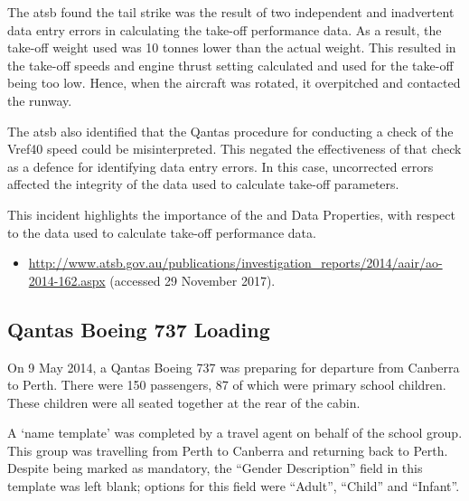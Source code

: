 The \gls{atsb} found the tail strike was the result of two independent and inadvertent data entry errors in calculating the take-off performance data. As a result, the take-off weight used was 10 tonnes lower than the actual weight. This resulted in the take-off speeds and engine thrust setting calculated and used for the take-off being too low. Hence, when the aircraft was rotated, it overpitched and contacted the runway.

The \gls{atsb} also identified that the Qantas procedure for conducting a check of the Vref40 speed could be misinterpreted. This negated the effectiveness of that check as a defence for identifying data entry errors. In this case, uncorrected errors affected the \gls{integrity} of the data used to calculate take-off parameters.

This incident highlights the importance of the  and  Data Properties, with respect to the data used to calculate take-off performance data.

\begin{samepage}
\begin{itemize}
  \item \raggedright{\href{http://www.atsb.gov.au/publications/investigation_reports/2014/aair/ao-2014-162.aspx}{http://www.atsb.gov.au/publications/investigation\_reports/2014/aair/ao-2014-162.aspx} (accessed 29 November 2017).}
\end{itemize}
\end{samepage}


\subsection{Qantas Boeing 737 Loading} \label{bkm:incacc:qantasloading}
On 9 May 2014, a Qantas Boeing 737 was preparing for departure from Canberra to Perth. There were 150 passengers, 87 of which were primary school children. These children were all seated together at the rear of the cabin. 

A `name template' was completed by a travel agent on behalf of the school group. This group was travelling from Perth to Canberra and returning back to Perth. Despite being marked as mandatory, the ``Gender Description'' field in this template was left blank; options for this field were ``Adult'', ``Child'' and ``Infant''.

